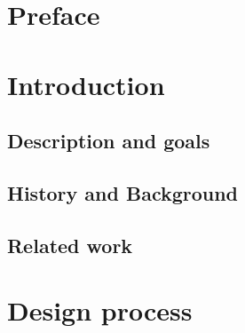 \documentclass[BSP,english,oneside]{classes/gucthesis}
\begin{document}


\makefrontpages



\clearpage
\setcounter{page}{1}



\chapter*{Preface}
	\label{chap:preface}
	


\tableofcontents
\listoffigures
\listoftables


\newpage
\setcounter{page}{1}
\chapter{Introduction}
	
		\setcounter{page}{2}	%
		\label{sec:introduction}
		

	\section{Description and goals}
		\label{sec:description_goals}
		

	\section{History and Background}
		\label{sec:history_and_background}
		

	\section{Related work}
		\label{sec:related_work}
		


\chapter{Design process}
	\label{chap:design_process}
\end{document}
